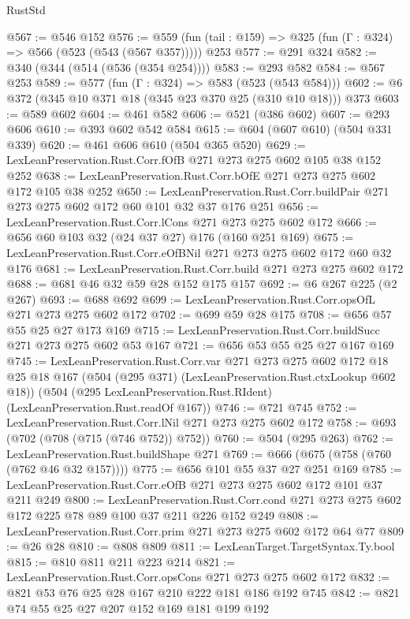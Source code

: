 \begin{lexlean}{RustStd}
\begin{coremodule}
{\begin{coremodule}
{{{{{@567 := @546 @152
@576 := @559 (fun (tail : @159) => @325 (fun (Γ : @324) => @566 (@523 (@543 (@567 @357))))) @253
@577 := @291 @324
@582 := @340 (@344 (@514 (@536 (@354 @254))))
@583 := @293 @582
@584 := @567 @253
@589 := @577 (fun (Γ : @324) => @583 (@523 (@543 @584)))
@602 := @6 @372 (@345 @10 @371 @18 (@345 @23 @370 @25 (@310 @10 @18))) @373
@603 := @589 @602
@604 := @461 @582
@606 := @521 (@386 @602)
@607 := @293 @606
@610 := @393 @602 @542 @584
@615 := @604 (@607 @610) (@504 @331 @339)
@620 := @461 @606 @610 (@504 @365 @520)
@629 := LexLeanPreservation.Rust.Corr.fOfB @271 @273 @275 @602 @105 @38 @152 @252
@638 := LexLeanPreservation.Rust.Corr.bOfE @271 @273 @275 @602 @172 @105 @38 @252
@650 := LexLeanPreservation.Rust.Corr.buildPair @271 @273 @275 @602 @172 @60 @101 @32 @37 @176 @251
@656 := LexLeanPreservation.Rust.Corr.lCons @271 @273 @275 @602 @172
@666 := @656 @60 @103 @32 (@24 @37 @27) @176 (@160 @251 @169)
@675 := LexLeanPreservation.Rust.Corr.eOfBNil @271 @273 @275 @602 @172 @60 @32 @176
@681 := LexLeanPreservation.Rust.Corr.build @271 @273 @275 @602 @172
@688 := @681 @46 @32 @59 @28 @152 @175 @157
@692 := @6 @267 @225 (@2 @267)
@693 := @688 @692
@699 := LexLeanPreservation.Rust.Corr.opsOfL @271 @273 @275 @602 @172
@702 := @699 @59 @28 @175
@708 := @656 @57 @55 @25 @27 @173 @169
@715 := LexLeanPreservation.Rust.Corr.buildSucc @271 @273 @275 @602 @53 @167
@721 := @656 @53 @55 @25 @27 @167 @169
@745 := LexLeanPreservation.Rust.Corr.var
    @271
    @273
    @275
    @602
    @172
    @18
    @25
    @18
    @167
    (@504 (@295 @371) (LexLeanPreservation.Rust.ctxLookup @602 @18))
    (@504 (@295 LexLeanPreservation.Rust.RIdent) (LexLeanPreservation.Rust.readOf @167))
@746 := @721 @745
@752 := LexLeanPreservation.Rust.Corr.lNil @271 @273 @275 @602 @172
@758 := @693 (@702 (@708 (@715 (@746 @752)) @752))
@760 := @504 (@295 @263)
@762 := LexLeanPreservation.Rust.buildShape @271
@769 := @666 (@675 (@758 (@760 (@762 @46 @32 @157))))
@775 := @656 @101 @55 @37 @27 @251 @169
@785 := LexLeanPreservation.Rust.Corr.eOfB @271 @273 @275 @602 @172 @101 @37 @211 @249
@800 := LexLeanPreservation.Rust.Corr.cond
    @271
    @273
    @275
    @602
    @172
    @225
    @78
    @89
    @100
    @37
    @211
    @226
    @152
    @249
@808 := LexLeanPreservation.Rust.Corr.prim @271 @273 @275 @602 @172 @64 @77
@809 := @26 @28
@810 := @808 @809
@811 := LexLeanTarget.TargetSyntax.Ty.bool
@815 := @810 @811 @211 @223 @214
@821 := LexLeanPreservation.Rust.Corr.opsCons @271 @273 @275 @602 @172
@832 := @821 @53 @76 @25 @28 @167 @210 @222 @181 @186 @192 @745
@842 := @821 @74 @55 @25 @27 @207 @152 @169 @181 @199 @192
}}}}}
\end{coremodule}}
\end{coremodule}
\end{lexlean}
